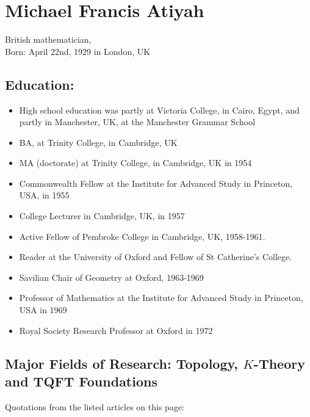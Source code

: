 \documentclass[12pt]{article}
\theoremstyle{plain}
\theoremstyle{definition}
\numberwithin{equation}{section}
\begin{document}
\section{Michael Francis Atiyah}
British mathematician, \\
Born:  April 22nd, 1929 in London, UK

\subsection{Education:}
\begin{itemize}
\item High school education was partly at Victoria College, in Cairo, Egypt,
and partly in Manchester, UK,  at the Manchester Grammar School
\item BA, at Trinity College, in Cambridge, UK 
\item MA (doctorate) at Trinity College, in Cambridge, UK in 1954
\item Commonwealth Fellow at the Institute for Advanced Study in Princeton, USA, in 1955
\item College Lecturer in Cambridge, UK, in 1957 
\item Active Fellow of Pembroke College in Cambridge, UK, 1958-1961.
\item Reader at the University of Oxford and Fellow of St Catherine's College. 
\item Savilian Chair of Geometry at Oxford, 1963-1969
\item Professor of Mathematics at the Institute for Advanced Study in Princeton, USA in 1969
\item Royal Society Research Professor at Oxford in 1972
\end{itemize}

\subsection{Major Fields of Research: Topology, $K$-Theory and TQFT Foundations}
Quotations from the listed articles on this page:
\end{document}
